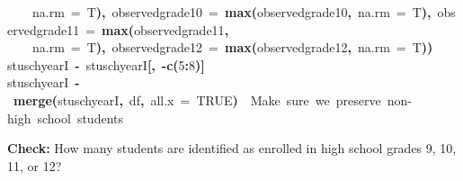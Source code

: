 \documentclass[12pt]{article}
\makeatletter
\newcommand{\hlnumber}[1]{\textcolor[rgb]{0,0,0}{#1}}%
\newcommand{\hlfunctioncall}[1]{\textcolor[rgb]{0.501960784313725,0,0.329411764705882}{\textbf{#1}}}%
\newcommand{\hlkeyword}[1]{\textcolor[rgb]{0,0,0}{\textbf{#1}}}%
\newcommand{\hlargument}[1]{\textcolor[rgb]{0.690196078431373,0.250980392156863,0.0196078431372549}{#1}}%
\newcommand{\hlcomment}[1]{\textcolor[rgb]{0.180392156862745,0.6,0.341176470588235}{#1}}%
\newcommand{\hlassignement}[1]{\textcolor[rgb]{0,0,0}{\textbf{#1}}}%
\newcommand{\hlsymbol}[1]{\textcolor[rgb]{0,0,0}{#1}}%
\newcommand{\hlstd}[1]{\textcolor[rgb]{0,0,0}{#1}}%
\newenvironment{kframe}{%
 \def\FrameCommand##1{\hskip\@totalleftmargin \hskip-\fboxsep
 \colorbox{shadecolor}{##1}\hskip-\fboxsep
     \hskip-\linewidth \hskip-\@totalleftmargin \hskip\columnwidth}%
 \MakeFramed {\advance\hsize-\width
   \@totalleftmargin\z@ \linewidth\hsize
   \@setminipage}}%
 {\par\unskip\endMakeFramed}
\newenvironment{knitrout}{}{} %
\renewenvironment{knitrout}{\begin{footnotesize}}{\end{footnotesize}}
\makeatother
\begin{document}
\begin{knitrout}
\begin{kframe}
\begin{flushleft}
\hlstd{}{\ }{\ }{\ }{\ }\hlargument{na.rm}{\ }\hlargument{=}{\ }\hlsymbol{T}\hlkeyword{)}\hlkeyword{,}{\ }\hlargument{observed\usebox{\hlnormalsizeboxunderscore}grade\usebox{\hlnormalsizeboxunderscore}10}{\ }\hlargument{=}{\ }\hlfunctioncall{max}\hlkeyword{(}\hlsymbol{observed\usebox{\hlnormalsizeboxunderscore}grade\usebox{\hlnormalsizeboxunderscore}10}\hlkeyword{,}{\ }\hlargument{na.rm}{\ }\hlargument{=}{\ }\hlsymbol{T}\hlkeyword{)}\hlkeyword{,}{\ }\hlargument{observed\usebox{\hlnormalsizeboxunderscore}grade\usebox{\hlnormalsizeboxunderscore}11}{\ }\hlargument{=}{\ }\hlfunctioncall{max}\hlkeyword{(}\hlsymbol{observed\usebox{\hlnormalsizeboxunderscore}grade\usebox{\hlnormalsizeboxunderscore}11}\hlkeyword{,}\hspace*{\fill}\\
\hlstd{}{\ }{\ }{\ }{\ }\hlargument{na.rm}{\ }\hlargument{=}{\ }\hlsymbol{T}\hlkeyword{)}\hlkeyword{,}{\ }\hlargument{observed\usebox{\hlnormalsizeboxunderscore}grade\usebox{\hlnormalsizeboxunderscore}12}{\ }\hlargument{=}{\ }\hlfunctioncall{max}\hlkeyword{(}\hlsymbol{observed\usebox{\hlnormalsizeboxunderscore}grade\usebox{\hlnormalsizeboxunderscore}12}\hlkeyword{,}{\ }\hlargument{na.rm}{\ }\hlargument{=}{\ }\hlsymbol{T}\hlkeyword{)}\hlkeyword{)}\hspace*{\fill}\\
\hlstd{}\hlsymbol{stuschyearI}{\ }\hlassignement{\usebox{\hlnormalsizeboxlessthan}-}{\ }\hlsymbol{stuschyearI}\hlkeyword{[}\hlkeyword{,}{\ }\hlkeyword{-}\hlfunctioncall{c}\hlkeyword{(}\hlnumber{5}\hlkeyword{:}\hlnumber{8}\hlkeyword{)}\hlkeyword{]}\hspace*{\fill}\\
\hlstd{}\hlsymbol{stuschyearI}{\ }\hlassignement{\usebox{\hlnormalsizeboxlessthan}-}{\ }\hlfunctioncall{merge}\hlkeyword{(}\hlsymbol{stuschyearI}\hlkeyword{,}{\ }\hlsymbol{df}\hlkeyword{,}{\ }\hlargument{all.x}{\ }\hlargument{=}{\ }\hlnumber{TRUE}\hlkeyword{)}{\ }{\ }\hlcomment{\usebox{\hlnormalsizeboxhash}{\ }Make{\ }sure{\ }we{\ }preserve{\ }non-high{\ }school{\ }students}\mbox{}
\normalfont
\end{flushleft}
\end{kframe}
\end{knitrout}


\textbf{Check:} How many students are identified as enrolled in high school grades 9, 10, 11, or 12?
\end{document}
